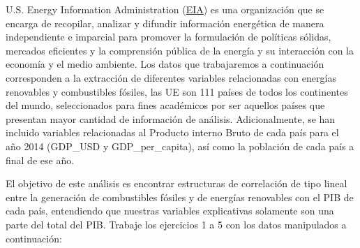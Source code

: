 \documentclass[
]{article}
\begin{document}
U.S. Energy Information Administration
(\href{https://www.eia.gov/}{EIA}) es una organización que se encarga de
recopilar, analizar y difundir información energética de manera
independiente e imparcial para promover la formulación de políticas
sólidas, mercados eficientes y la comprensión pública de la energía y su
interacción con la economía y el medio ambiente. Los datos que
trabajaremos a continuación corresponden a la extracción de diferentes
variables relacionadas con energías renovables y combustibles fósiles,
las UE son 111 países de todos los continentes del mundo, seleccionados
para fines académicos por ser aquellos países que presentan mayor
cantidad de información de análisis. Adicionalmente, se han incluido
variables relacionadas al Producto interno Bruto de cada país para el
año 2014 (GDP\_USD y GDP\_per\_capita), así como la población de cada
país a final de ese año.

El objetivo de este análisis es encontrar estructuras de correlación de
tipo lineal entre la generación de combustibles fósiles y de energías
renovables con el PIB de cada país, entendiendo que nuestras variables
explicativas solamente son una parte del total del PIB. Trabaje los
ejercicios 1 a 5 con los datos manipulados a continuación:
\end{document}
